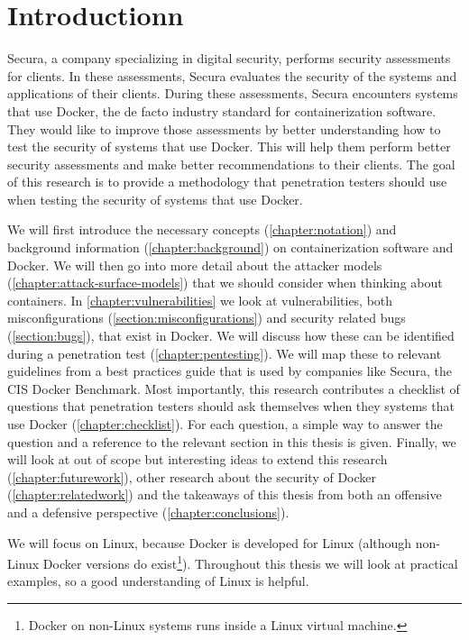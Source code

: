 \chapter{Introductionn}
Secura, a company specializing in digital security, performs security assessments for clients. In these assessments, Secura evaluates the security of the systems and applications of their clients. During these assessments, Secura encounters systems that use Docker, the de facto industry standard for containerization software. They would like to improve those assessments by better understanding how to test the security of systems that use Docker. This will help them perform better security assessments and make better recommendations to their clients. The goal of this research is to provide a methodology that penetration testers should use when testing the security of systems that use Docker.

\medskip

We will first introduce the necessary concepts (\autoref{chapter:notation}) and background information (\autoref{chapter:background}) on containerization software and Docker. We will then go into more detail about the attacker models (\autoref{chapter:attack-surface-models}) that we should consider when thinking about containers. In \autoref{chapter:vulnerabilities} we look at vulnerabilities, both misconfigurations (\autoref{section:misconfigurations}) and security related bugs (\autoref{section:bugs}), that exist in Docker. We will discuss how these can be identified during a penetration test (\autoref{chapter:pentesting}). We will map these to relevant guidelines from a best practices guide that is used by companies like Secura, the CIS Docker Benchmark. Most importantly, this research contributes a checklist of questions that penetration testers should ask themselves when they systems that use Docker (\autoref{chapter:checklist}). For each question, a simple way to answer the question and a reference to the relevant section in this thesis is given. Finally, we will look at out of scope but interesting ideas to extend this research (\autoref{chapter:futurework}), other research about the security of Docker (\autoref{chapter:relatedwork}) and the takeaways of this thesis from both an offensive and a defensive perspective (\autoref{chapter:conclusions}).

We will focus on Linux, because Docker is developed for Linux (although non-Linux Docker versions do exist\footnote{Docker on non-Linux systems runs inside a Linux virtual machine.}). Throughout this thesis we will look at practical examples, so a good understanding of Linux is helpful.
